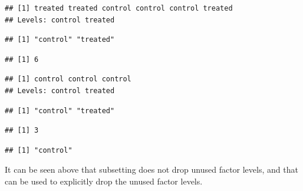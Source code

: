 \documentclass[krantz2]{krantz}\usepackage{knitr}
\begin{document}
\begin{knitrout}\footnotesize
{}\color{fgcolor}\begin{kframe}
\begin{alltt}
\end{alltt}
\begin{verbatim}
## [1] treated treated control control control treated
## Levels: control treated
\end{verbatim}
\begin{alltt}
\end{alltt}
\begin{verbatim}
## [1] "control" "treated"
\end{verbatim}
\begin{alltt}
\end{alltt}
\begin{verbatim}
## [1] 6
\end{verbatim}
\begin{alltt}
 \hlkwb{<-} \hlstd{my.factor[my.factor} \hlopt{==} \hlstd{]}
\end{alltt}
\begin{verbatim}
## [1] control control control
## Levels: control treated
\end{verbatim}
\begin{alltt}
 
\end{alltt}
\begin{verbatim}
## [1] "control" "treated"
\end{verbatim}
\begin{alltt}
 
\end{alltt}
\begin{verbatim}
## [1] 3
\end{verbatim}
\begin{alltt}
 \hlkwb{<-} 
 
\end{alltt}
\begin{verbatim}
## [1] "control"
\end{verbatim}
\end{kframe}
\end{knitrout}

It can be seen above that subsetting does not drop unused factor levels, and that  can be used to explicitly drop the unused factor levels.
\end{document}
